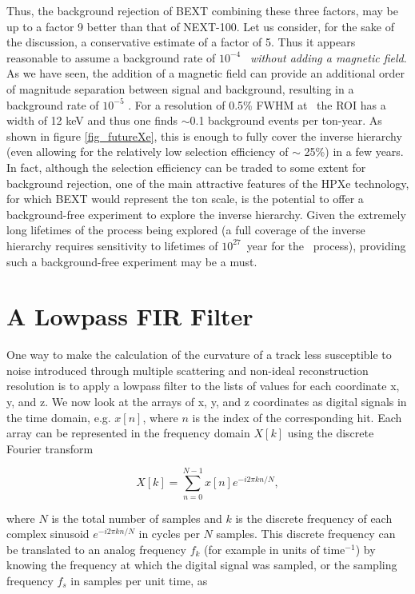 \documentclass{JINST}
\begin{document}
Thus, the background rejection of BEXT combining these three factors, may be up to a factor 9 better than that of NEXT-100. Let us consider, for the sake of the discussion, a conservative estimate of a factor of 5. Thus it appears reasonable to assume a background rate of $10^{-4}$ \ckky\ {\em without adding a magnetic field}. As we have seen, the addition of a magnetic field can provide an additional order of magnitude separation between signal and background, resulting in a background rate of $10^{-5}$ \ckky.  For a resolution of 0.5\% FWHM at \Qbb\ the ROI has a width of 12 keV and thus one finds $\sim$0.1 background events per ton-year. As shown in figure \ref{fig_futureXe}, this is enough to fully cover the inverse hierarchy (even allowing for the relatively low selection efficiency of $\sim$ 25\%) in a few years. In fact, although the selection efficiency can be traded to some extent for background rejection, one of the main attractive features of the HPXe technology, for which BEXT would represent the ton scale, is the potential to offer a  background-free experiment to explore the inverse hierarchy. Given the extremely long lifetimes of the process being explored (a full coverage of the inverse hierarchy requires sensitivity to lifetimes of $10^{27}$~year for the \bbonu\ process), providing such a background-free experiment may be a must. 

\appendix

\section{A Lowpass FIR Filter}\label{app:FIR}

One way to make the calculation of the curvature of a track less susceptible to noise 
introduced through multiple scattering and non-ideal reconstruction resolution is to apply a lowpass filter to 
the lists of values for each coordinate x, y, and z.  We now look at the arrays of x, y, and z coordinates as digital 
signals in the time domain, e.g. $x[n]$, where $n$ is the index of the corresponding hit.  Each array can be 
represented in the frequency domain $X[k]$ using the discrete Fourier transform

\begin{equation}
X[k] = \sum_{n=0}^{N-1}x[n]e^{-i2\pi kn/N},
\end{equation}

\noindent where $N$ is the total number of samples and $k$ is the discrete frequency of each complex
sinusoid $e^{-i2\pi kn/N}$ in cycles per $N$ samples.  This discrete frequency can be translated to an analog
frequency $f_{k}$ (for example in units of time$^{-1}$) by knowing the frequency at which the digital signal was
sampled, or the sampling frequency $f_{s}$ in samples per unit time, as
\end{document}
